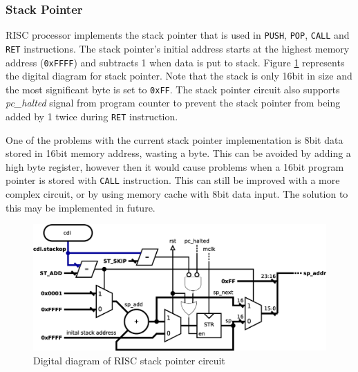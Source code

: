 \documentclass[a4paper,12pt]{article}
\begin{document}
\begin{multicols}{2}
	
\subsubsection{Stack Pointer} \label{sec:sp}
RISC processor implements the stack pointer that is used in \texttt{PUSH}, \texttt{POP}, \texttt{CALL} and \texttt{RET} instructions. The stack pointer's initial address starts at the highest memory address (\texttt{0xFFFF}) and subtracts 1 when data is put to stack. Figure \ref{fig:stack_pointer} represents the digital diagram for stack pointer. Note that the stack is only 16bit in size and the most significant byte is set to \texttt{0xFF}. The stack pointer circuit also supports \textit{pc\_halted} signal from program counter to prevent the stack pointer from being added by 1 twice during \texttt{RET} instruction. 

One of the problems with the current stack pointer implementation is 8bit data stored in 16bit memory address, wasting a byte. This can be avoided by adding a high byte register, however then it would cause problems when a 16bit program pointer is stored with \texttt{CALL} instruction. This can still be improved with a more complex circuit, or by using memory cache with 8bit data input. The solution to this may be implemented in future.

\end{multicols}

\begin{figure}[h!]
	\centering
	\includegraphics[scale=0.4]{graphics/stack_diagram.eps}
	\caption{Digital diagram of RISC stack pointer circuit}
	\label{fig:stack_pointer}
\end{figure}
\end{document}
